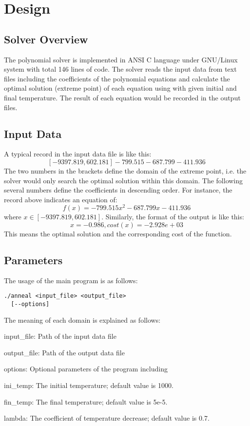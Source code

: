 \section{Design}
\label{sec:design}
\subsection{Solver Overview}
The \SA polynomial solver is implemented in ANSI C language under GNU/Linux system with total 146 lines of code. The solver reads the input data from text files including the coefficients of the polynomial equations and calculate the optimal solution (extreme point) of each equation using \SA with given initial and final temperature. The result of each equation would be recorded in the output files.
\subsection{Input Data}
A typical record in the input data file is like this:
$$[-9397.819, 602.181] -799.515 -687.799 -411.936$$
The two numbers in the brackets define the domain of the extreme point, i.e. the solver would only search the optimal solution within this domain. The following several numbers define the coefficients in descending order. For instance, the record above indicates an equation of:
$$f(x) = -799.515x^2-687.799x-411.936$$
where $x\in[-9397.819, 602.181]$. Similarly, the format of the output is like this:
$$x = -0.986, cost(x) = -2.928e+03$$
This means the optimal solution and the corresponding cost of the function.
\subsection{Parameters}
The usage of the main program is as follows:
\begin{verbatim}
./anneal <input_file> <output_file> 
  [--options]
\end{verbatim}
The meaning of each domain is explained as follows:
\begin{compactitem}
\item input\_file: Path of the input data file
\item output\_file: Path of the output data file
\item options: Optional parameters of the program including
    \begin{compactitem}
    \item ini\_temp: The initial temperature; default value is 1000.
    \item fin\_temp: The final temperature; default value is 5e-5.
    \item lambda: The coefficient of temperature decrease; default value is 0.7.
    \end{compactitem}
\end{compactitem}
